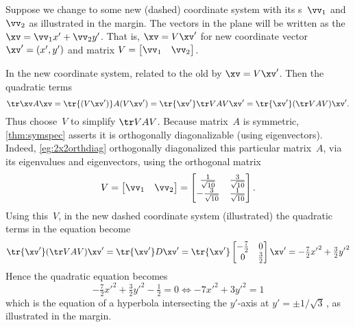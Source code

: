 \begin{example}
\begin{solution}
{}%
%
Suppose we change to some new (dashed) coordinate system with its s~\(\vv_1\) and~\(\vv_2\) as illustrated in the margin.
The vectors in the plane will be written as the  \(\xv=\vv_1x'+\vv_2y'\).
That is, \(\xv=V\xv'\) for new coordinate vector \(\xv'=(x',y')\) and matrix \(V=\begin{bmatrix} \vv_1&\vv_2 \end{bmatrix}\).

In the new coordinate system, related to the old by \(\xv=V\xv'\).
Then the quadratic terms 
\begin{equation*}
\tr\xv A\xv
=\tr{(V\xv')} A(V\xv')
=\tr{\xv'}\tr VAV\xv'
=\tr{\xv'}(\tr VAV)\xv'.
\end{equation*}
Thus choose~\(V\) to simplify \(\tr VAV\).
Because matrix~\(A\) is symmetric, \autoref{thm:symspec} asserts it is orthogonally diagonalizable (using eigenvectors).
Indeed, \cref{eg:2x2orthdiag} orthogonally diagonalized this particular matrix~\(A\), via its eigenvalues and eigenvectors, using the orthogonal matrix
\begin{equation*}
V=\begin{bmatrix} \vv_1&\vv_2 \end{bmatrix}
=\begin{bmatrix} \frac1{\sqrt{10}} & \frac3{\sqrt{10}}
\\ -\frac3{\sqrt{10}}& \frac1{\sqrt{10}} \end{bmatrix}.
\end{equation*}
Using this~\(V\), in the new dashed coordinate system (illustrated) the quadratic terms in the equation become
%
\begin{equation*}
\tr{\xv'}(\tr VAV)\xv'
=\tr{\xv'}D\xv'
=\tr{\xv'}\begin{bmatrix} -\tfrac72&0\\0&\tfrac32 \end{bmatrix}\xv'
=-\tfrac72{x'}^2+\tfrac32{y'}^2
\end{equation*}
Hence the quadratic equation becomes
\begin{equation*}
-\tfrac72{x'}^2+\tfrac32{y'}^2-\tfrac12=0
\iff -7{x'}^2+3{y'}^2=1
\end{equation*}
which is the equation of a hyperbola intersecting the \(y'\)-axis at \(y'=\pm1/\sqrt3\)\,, as illustrated in the margin.
\end{solution}
\end{example}





